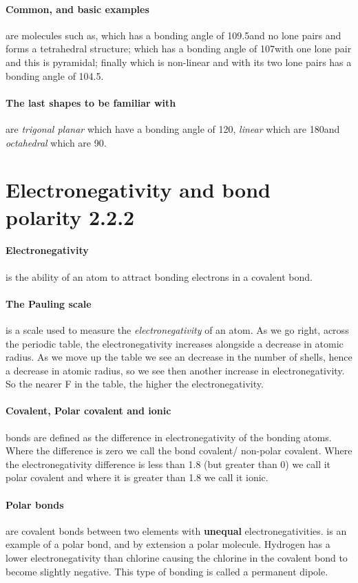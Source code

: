 	\paragraph{Common, and basic examples} are molecules such as,  which has a bonding angle of 109.5\degree and no lone pairs and forms a tetrahedral structure;  which has a bonding angle of 107\degree with one lone pair and this is pyramidal; finally  which is non-linear and with its two lone pairs has a bonding angle of 104.5\degree .
	
	\paragraph{The last shapes to be familiar with} are \textit{trigonal planar} which have a bonding angle of 120\degree , \textit{linear} which are 180\degree and \textit{octahedral} which are 90\degree . 
  \section{Electronegativity and bond polarity 2.2.2}
\paragraph{Electronegativity} is the ability of an atom to attract bonding electrons in a covalent bond.	
	\paragraph{The Pauling scale} is a scale used to measure the \textit{electronegativity} of an atom. As we go right, across the periodic table, the electronegativity increases alongside a decrease in atomic radius. As we move up the table we see an decrease in the number of shells, hence a decrease in atomic radius, so we see then another increase in electronegativity. So the nearer F in the table, the higher the electronegativity.
	\paragraph{Covalent, Polar covalent and ionic} bonds are defined as the difference in electronegativity of the bonding atoms.
	Where the difference is zero we call the bond covalent/ non-polar covalent.
	Where the electronegativity difference is less than 1.8 (but greater than 0) we call it polar covalent and where it is greater than 1.8 we call it ionic.
\paragraph{Polar bonds} are covalent bonds between two elements with \textbf{unequal} electronegativities.
	 is an example of a polar bond, and by extension a polar molecule.
	Hydrogen has a lower electronegativity than chlorine causing the chlorine in the covalent bond to become slightly negative.
	This type of bonding is called a permanent dipole.
